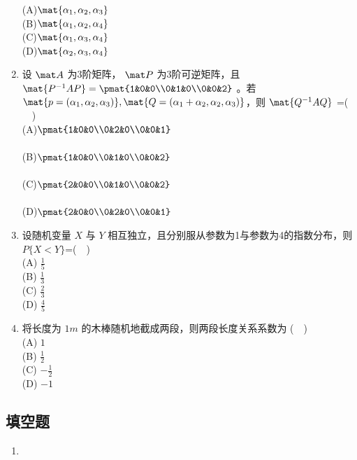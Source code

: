 \begin{enumerate}
(A)$\mat{ \alpha_1,\alpha_2,\alpha_3}$\\
(B)$\mat{ \alpha_1,\alpha_2,\alpha_4}$\\
(C)$\mat{ \alpha_1,\alpha_3,\alpha_4}$\\
(D)$\mat{ \alpha_2,\alpha_3,\alpha_4}$
\item 设 $\mat A$  为3阶矩阵， $\mat P$ 为3阶可逆矩阵，且 $\mat{P^{-1}AP}=\pmat{1&0&0\\0&1&0\\0&0&2}$  。若 $\mat{p=(\alpha_1,\alpha_2,\alpha_3)},\mat{Q=(\alpha_1+\alpha_2,\alpha_2,\alpha_3)}$，则 $\mat {Q^{-1}AQ}$ =($\quad$)\\
(A)$\pmat{1&0&0\\0&2&0\\0&0&1}$\\ \\
(B)$\pmat{1&0&0\\0&1&0\\0&0&2}$\\ \\
(C)$\pmat{2&0&0\\0&1&0\\0&0&2}$\\ \\
(D)$\pmat{2&0&0\\0&2&0\\0&0&1}$\\
\item 设随机变量 $X$ 与 $Y$ 相互独立，且分别服从参数为1与参数为4的指数分布，则  $P\{X<Y\}$=($\quad$)\\
(A) $\displaystyle \frac{1}{5}$\\
(B) $ \displaystyle \frac{1}{3}$\\
(C) $\displaystyle  \frac{2}{3}$\\
(D) $\displaystyle \frac{4}{5}$
\item  将长度为 $1m$ 的木棒随机地截成两段，则两段长度关系系数为 ($\quad$)\\
(A) $1$\\
(B) $\displaystyle \frac{1}{2}$\\
(C) $\displaystyle -\frac{1}{2}$\\
(D) $-1$
\end{enumerate}
\subsection{填空题}
\begin{enumerate}
\item 
\end{enumerate}
